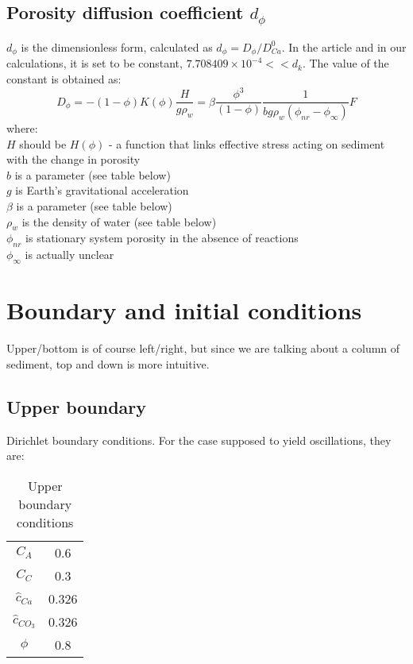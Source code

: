 \documentclass[10pt, letterpaper]{article}
\begin{document}
\subsection{Porosity diffusion coefficient $d_{\phi}$}
$d_{\phi}$ is the dimensionless form, calculated as $d_{\phi} = D_{\phi}/D_{Ca}^0$. 
In the article and in our calculations, it is set to be constant, $7.708409\times10^{-4} << d_k$. The value of the constant is obtained as:
\begin{equation}
    D_{\phi} = -\left(1 - \phi\right)K(\phi)\frac{H}{g\rho_w} = \beta\frac{\phi^3}{(1 - \phi)}\frac{1}{bg\rho_w(\phi_{nr}-\phi_{\infty})}F \tag{25}
\end{equation}
where:\\
$H$ should be $H(\phi)$ - a function that links effective stress acting on sediment with the change in porosity\\
$b$ is a parameter (see table below)\\
$g$ is Earth's gravitational acceleration\\
$\beta$ is a parameter (see table below)\\
$\rho_w$ is the density of water (see table below)\\
$\phi_{nr}$ is stationary system porosity in the absence of reactions\\
$\phi_{\infty}$ is actually unclear

\section{Boundary and initial conditions}
Upper/bottom is of course left/right, but since we are talking about a column of sediment, top and down is more intuitive.

\subsection{Upper boundary}
Dirichlet boundary conditions. For the case supposed to yield oscillations, they are:

\begin{table}[hbt!]
    \centering
    \begin{tabular}{cc}
         $C_A$& 0.6\\
         $C_C$& 0.3\\
         $\hat{c}_{Ca}$& 0.326\\
         $\hat{c}_{CO_3}$& 0.326\\
         $\phi$& 0.8\\
    \end{tabular}
    \caption{Upper boundary conditions}
\end{table}
\end{document}
